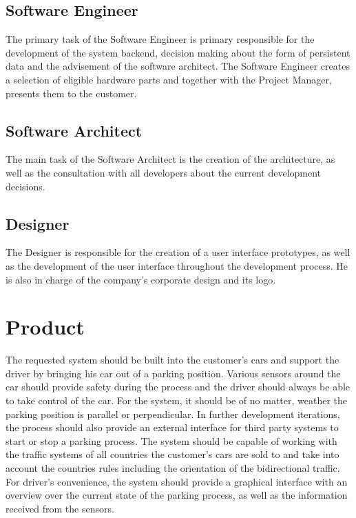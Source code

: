\subsection{Software Engineer}
The primary task of the Software Engineer is primary responsible for the
development of the system backend, decision making about the form of persistent
data and the advisement of the software architect. The Software Engineer creates
a selection of eligible hardware parts and together with the Project Manager,
presents them to the customer.

\subsection{Software Architect}
The main task of the Software Architect is the creation of the architecture, as
well as the consultation with all developers about the current development
decisions.

\subsection{Designer}
The Designer is responsible for the creation of a user interface prototypes, as
well as the development of the user interface throughout the development
process. He is also in charge of the company's corporate design and its logo.

\section{Product}
The requested system should be built into the customer's cars and support the
driver by bringing his car out of a parking position. Various sensors around the
car should provide safety during the process and the driver should always be
able to take control of the car. For the system, it should be of no matter,
weather the parking position is parallel or perpendicular. In further
development iterations, the process should also provide an external interface
for third party systems to start or stop a parking process. The system should be
capable of working with the traffic systems of all countries the customer's cars
are sold to and take into account the countries rules including the orientation
of the bidirectional traffic. For driver's convenience, the system should
provide a graphical interface with an overview over the current state of the
parking process, as well as the information received from the sensors.
